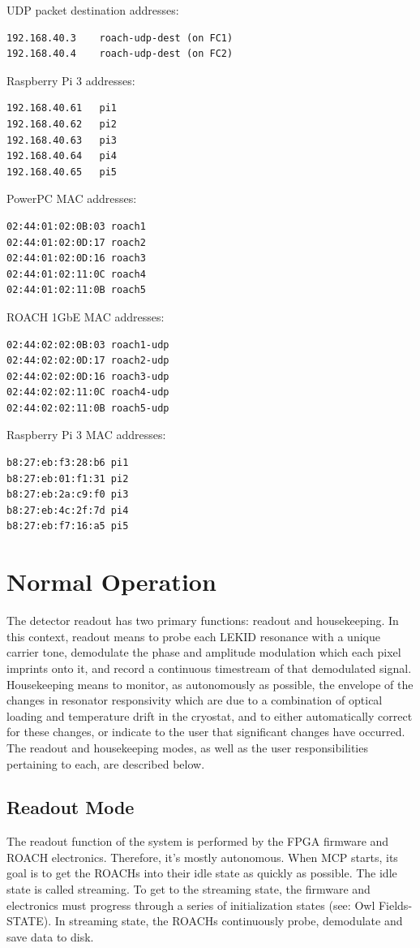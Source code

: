 \noindent UDP packet destination addresses:
\begin{verbatim}
192.168.40.3	roach-udp-dest (on FC1)
192.168.40.4	roach-udp-dest (on FC2)
\end{verbatim}

\noindent Raspberry Pi 3 addresses:
\begin{verbatim}
192.168.40.61	pi1
192.168.40.62	pi2
192.168.40.63	pi3
192.168.40.64	pi4
192.168.40.65	pi5
\end{verbatim}

\noindent PowerPC MAC addresses:
\begin{verbatim}
02:44:01:02:0B:03 roach1
02:44:01:02:0D:17 roach2
02:44:01:02:0D:16 roach3
02:44:01:02:11:0C roach4
02:44:01:02:11:0B roach5
\end{verbatim}

\noindent ROACH 1GbE MAC addresses:
\begin{verbatim}
02:44:02:02:0B:03 roach1-udp
02:44:02:02:0D:17 roach2-udp
02:44:02:02:0D:16 roach3-udp
02:44:02:02:11:0C roach4-udp
02:44:02:02:11:0B roach5-udp
\end{verbatim}

\noindent Raspberry Pi 3 MAC addresses:
\begin{verbatim}
b8:27:eb:f3:28:b6 pi1
b8:27:eb:01:f1:31 pi2
b8:27:eb:2a:c9:f0 pi3
b8:27:eb:4c:2f:7d pi4
b8:27:eb:f7:16:a5 pi5
\end{verbatim}

\section{Normal Operation}
The detector readout has two primary functions: readout and housekeeping. In this context, readout means to probe each LEKID resonance with a unique carrier tone, demodulate the phase and amplitude modulation which each pixel imprints onto it, and record a continuous timestream of that demodulated signal. Housekeeping means to monitor, as autonomously as possible, the envelope of the changes in resonator responsivity which are due to a combination of optical loading and temperature drift in the cryostat, and to either automatically correct for these changes, or indicate to the user that significant changes have occurred. The readout and housekeeping modes, as well as the user responsibilities pertaining to each, are described below.

\subsection{Readout Mode}\label{normal_mode}
The readout function of the system is performed by the FPGA firmware and ROACH electronics. Therefore, it’s mostly autonomous. When MCP starts, its goal is to get the ROACHs into their idle state as quickly as possible. The idle state is called streaming. To get to the streaming state, the firmware and electronics must progress through a series of initialization states (see: Owl Fields-STATE). In streaming state, the ROACHs continuously probe, demodulate and save data to disk.

